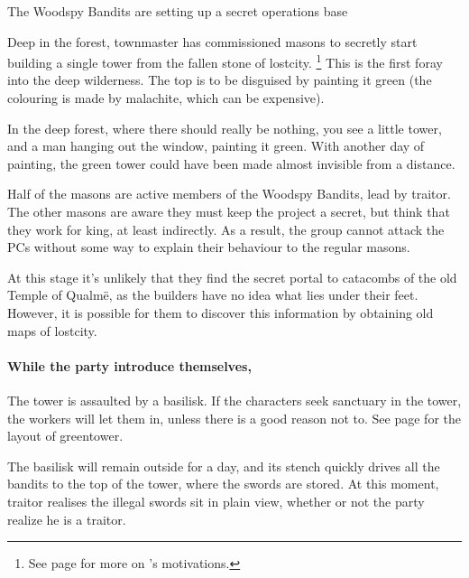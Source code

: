 \begin{multicols}{2}

{}%
{The Woodspy Bandits are setting up a secret operations base}%

Deep in the forest, \gls{townmaster} has commissioned masons to secretly start building a single tower from the fallen stone of \gls{lostcity}.
\footnote{See page \pageref{expanding_wilderness} for more on 's motivations.}
This is the first foray into the deep wilderness.
The top is to be disguised by painting it green (the colouring is made by malachite, which can be expensive).

\begin{boxtext}

  In the deep forest, where there should really be nothing, you see a little tower, and a man hanging out the window, painting it green.
  With another day of painting, the green tower could have been made almost invisible from a distance.

\end{boxtext}

Half of the masons are active members of the Woodspy Bandits, lead by \gls{traitor}.
The other masons are aware they must keep the project a secret, but think that they work for \gls{king}, at least indirectly.
As a result, the group cannot attack the PCs without some way to explain their behaviour to the regular masons.

At this stage it's unlikely that they find the secret portal to catacombs of the old Temple of Qualm\"{e}, as the builders have no idea what lies under their feet.
However, it is possible for them to discover this information by obtaining old maps of \gls{lostcity}.

\paragraph{While the party introduce themselves,}
The tower is assaulted by a basilisk.
If the characters seek sanctuary in the tower, the workers will let them in, unless there is a good reason not to.
See page \pageref{green_tower} for the layout of \gls{greentower}.

The basilisk will remain outside for a day, and its stench quickly drives all the bandits to the top of the tower, where the swords are stored.
At this moment, \gls{traitor} realises the illegal swords sit in plain view, whether or not the party realize he is a traitor.


\end{multicols}
